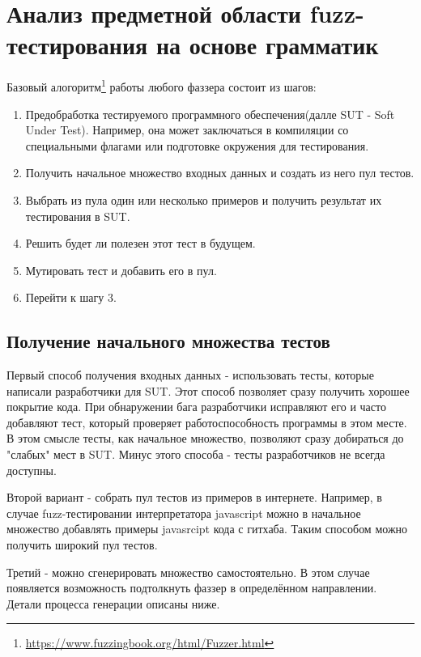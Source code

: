 \documentclass[a4paper]{article}
\begin{document}
\newpage
\section{Анализ предметной области fuzz-тестирования на основе грамматик}
\indent
 
Базовый алогоритм\footnote[1]{\href{https://www.fuzzingbook.org/html/Fuzzer.html}{https://www.fuzzingbook.org/html/Fuzzer.html}} работы любого фаззера состоит из шагов:

\begin{enumerate}
    \item Предобработка тестируемого программного обеспечения(далле SUT - Soft Under Test). Например, она может заключаться в компиляции со специальными флагами или подготовке окружения для тестирования. 
    \item Получить начальное множество входных данных и создать из него пул тестов.
    \item Выбрать из пула один или несколько примеров и получить результат их тестирования в SUT.
    \item Решить будет ли полезен этот тест в будущем.
    \item Мутировать тест и добавить его в пул.
    \item Перейти к шагу 3.
\end{enumerate}

\subsection{Получение начального множества тестов}
\indent

Первый способ получения входных данных - использовать тесты, которые написали разработчики для SUT. Этот способ позволяет сразу получить хорошее покрытие кода. При обнаружении бага разработчики исправляют его и часто добавляют тест, который проверяет работоспособность программы в этом месте. В этом смысле тесты, как начальное множество, позволяют сразу добираться до "слабых" мест в SUT. Минус этого способа - тесты разработчиков не всегда доступны.
\indent

Второй вариант - собрать пул тестов из примеров в интернете. Например, в случае fuzz-тестировании интерпретатора javascript можно в начальное множество добавлять примеры javasrcipt кода с гитхаба. Таким способом можно получить широкий пул тестов.
\indent

Третий - можно сгенерировать множество самостоятельно. В этом случае появляется возможность подтолкнуть фаззер в определённом направлении. Детали процесса генерации описаны ниже.
\end{document}
